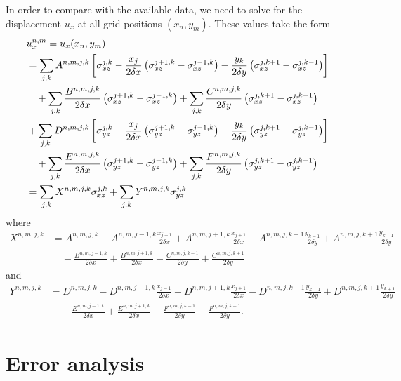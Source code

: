 \documentclass{article}
\begin{document}
In order to compare with the available data, we need to solve for the displacement $u_x$ at all grid positions $(x_n,y_m)$. These values take the form
\begin{align}
\lefteqn{u_x^{n,m} = u_x(x_n,y_m) }\nonumber\\
 &= \sum_{j,k} A^{n,m,j,k}\left[ \sigma_{xz}^{j,k} - \frac{x_j}{2\delta x} \left(\sigma_{xz}^{j+1,k}  -  \sigma_{xz}^{j-1,k} \right) -\frac{y_k}{2\delta y}\left( \sigma_{xz}^{j,k+1}- \sigma_{xz}^{j,k-1} \right) \right] \nonumber\\
 &\quad + \sum_{j,k} \frac{B^{n,m,j,k}}{2\delta x} \left(\sigma_{xz}^{j+1,k}  - \sigma_{xz}^{j-1,k} \right) + \sum_{j,k} \frac{C^{n,m,j,k}}{2\delta y}\left( \sigma_{xz}^{j,k+1} -  \sigma_{xz}^{j,k-1} \right)\nonumber\\
  &+ \sum_{j,k} D^{n,m,j,k}\left[ \sigma_{yz}^{j,k} - \frac{x_j}{2\delta x} \left(\sigma_{yz}^{j+1,k}  -  \sigma_{yz}^{j-1,k} \right) -\frac{y_k}{2\delta y}\left( \sigma_{yz}^{j,k+1}- \sigma_{yz}^{j,k-1} \right) \right] \nonumber\\
 &\quad + \sum_{j,k} \frac{E^{n,m,j,k}}{2\delta x} \left(\sigma_{yz}^{j+1,k}  -   \sigma_{yz}^{j-1,k} \right) + \sum_{j,k} \frac{F^{n,m,j,k}}{2\delta y}\left( \sigma_{yz}^{j,k+1} -   \sigma_{yz}^{j,k-1} \right)\nonumber\\
 &= \sum_{j,k} X^{n,m,j,k} \sigma_{xz}^{j,k} +  \sum_{j,k}Y^{n,m,j,k} \sigma_{yz}^{j,k} 
\end{align}
where 
\begin{align}
X^{n,m,j,k} &= A^{n,m,j,k} - A^{n,m,j-1,k}\frac{x_{j-1}}{2\delta x} +A^{n,m,j+1,k}\frac{x_{j+1}}{2\delta x} - A^{n,m,j,k-1}\frac{y_{k-1}}{2\delta y} +A^{n,m,j,k+1}\frac{y_{k+1}}{2\delta y} \nonumber\\
&\quad-\frac{B^{n,m,j-1,k}}{2\delta x} +\frac{B^{n,m,j+1,k}}{2\delta x} - \frac{C^{n,m,j,k-1}}{2\delta y} +\frac{C^{n,m,j,k+1}}{2\delta y}
\end{align}
and
\begin{align}
Y^{n,m,j,k} &= D^{n,m,j,k} - D^{n,m,j-1,k}\frac{x_{j-1}}{2\delta x} +D^{n,m,j+1,k}\frac{x_{j+1}}{2\delta x} - D^{n,m,j,k-1}\frac{y_{k-1}}{2\delta y} +D^{n,m,j,k+1}\frac{y_{k+1}}{2\delta y} \nonumber\\
&\quad-\frac{E^{n,m,j-1,k}}{2\delta x} +\frac{E^{n,m,j+1,k}}{2\delta x} - \frac{F^{n,m,j,k-1}}{2\delta y} +\frac{F^{n,m,j,k+1}}{2\delta y}.
\end{align}

\section{Error analysis}
\end{document}
